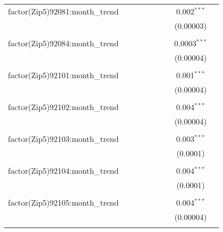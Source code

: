 \begin{table}[H]
{\begin{tabular}{@{\extracolsep{5pt}}lcccccccc}
  factor(Zip5)92081:month\_trend &  &  &  &  &  &  & 0.002$^{***}$ &  \\  

   &  &  &  &  &  &  & (0.00003) &  \\  

   & & & & & & & & \\  

  factor(Zip5)92084:month\_trend &  &  &  &  &  &  & 0.0003$^{***}$ &  \\  

   &  &  &  &  &  &  & (0.00004) &  \\  

   & & & & & & & & \\  

  factor(Zip5)92101:month\_trend &  &  &  &  &  &  & 0.001$^{***}$ &  \\  

   &  &  &  &  &  &  & (0.00004) &  \\  

   & & & & & & & & \\  

  factor(Zip5)92102:month\_trend &  &  &  &  &  &  & 0.004$^{***}$ &  \\  

   &  &  &  &  &  &  & (0.00004) &  \\  

   & & & & & & & & \\  

  factor(Zip5)92103:month\_trend &  &  &  &  &  &  & 0.003$^{***}$ &  \\  

   &  &  &  &  &  &  & (0.0001) &  \\  

   & & & & & & & & \\  

  factor(Zip5)92104:month\_trend &  &  &  &  &  &  & 0.004$^{***}$ &  \\  

   &  &  &  &  &  &  & (0.0001) &  \\  

   & & & & & & & & \\  

  factor(Zip5)92105:month\_trend &  &  &  &  &  &  & 0.004$^{***}$ &  \\  

   &  &  &  &  &  &  & (0.00004) &  \\  

   & & & & & & & & \\  


\end{tabular}}
\end{table}
